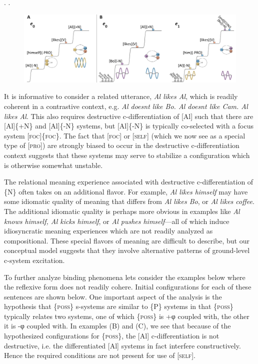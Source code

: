 \ea
{}.  
.  
\z
\z
  
\begin{figure}
\includegraphics[width=\textwidth]{figures/Tilsen-img156.png}
\caption{\missingcaption}
\label{fig:}
\end{figure}
 

  It is informative to consider a related utterance, \textit{Al likes Al}, which is readily coherent in a contrastive context, e.g. \textit{Al doesnt like Bo. Al doesnt like Cam. Al likes Al}. This also requires destructive c-differentiation of [Al] such that there are [Al]\{+N\} and [Al]\{-N\} systems, but [Al]\{-N\} is typically co-selected with a focus system [\textsc{foc}]\{\textsc{foc}\}. The fact that [\textsc{foc}] or [\textsc{self}] (which we now see as a special type of [\textsc{pro}]) are strongly biased to occur in the destructive c-differentiation context suggests that these systems may serve to stabilize a configuration which is otherwise somewhat unstable.

  The relational meaning experience associated with destructive c-differentiation of \{N\} often takes on an additional flavor. For example, \textit{Al likes himself} may have some idiomatic quality of meaning that differs from \textit{Al likes Bo}, or \textit{Al likes coffee}. The additional idiomatic quality is perhaps more obvious in examples like \textit{Al knows himself, Al kicks himself}, or \textit{Al pushes himself}—all of which induce idiosyncratic meaning experiences which are not readily analyzed as compositional. These special flavors of meaning are difficult to describe, but our conceptual model suggests that they involve alternative patterns of ground-level c-system excitation.

  To further analyze binding phenomena lets consider the examples below where the reflexive form does not readily cohere. Initial configurations for each of these sentences are shown below. One important aspect of the analysis is the hypothesis that \{\textsc{poss}\} s-systems are similar to \{P\} systems in that \{\textsc{poss}\} typically relates two systems, one of which \{\textsc{poss}\} is +φ coupled with, the other it is -φ coupled with. In examples (B) and (C), we see that because of the hypothesized configurations for \{\textsc{poss}\}, the [Al] c-differentiation is not destructive, i.e. the differentiated [Al] systems in fact interfere constructively. Hence the required conditions are not present for use of [\textsc{self}]. 

